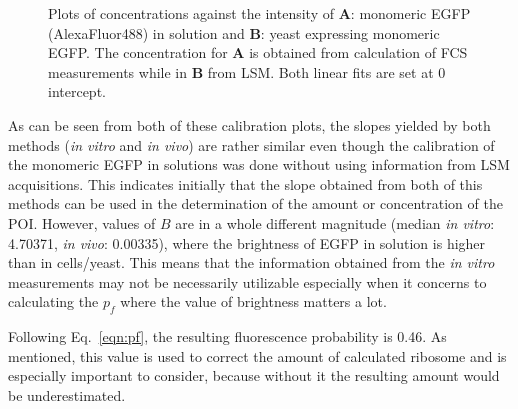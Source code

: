 \begin{figure}[!h]
\centering
{}\hfil
{}
\caption{Plots of concentrations against the intensity of \textbf{A}: monomeric EGFP (AlexaFluor488) in solution and \textbf{B}: yeast expressing monomeric EGFP. The concentration for \textbf{A} is obtained from calculation of FCS measurements while in \textbf{B} from LSM. 
Both linear fits are set at 0 intercept.}
\label{fig:monogfp}
\end{figure}

As can be seen from both of these calibration plots, the slopes yielded by both methods (\textit{in vitro} and \textit{in vivo}) are rather similar even though the calibration of the monomeric EGFP in solutions was done without using information from LSM acquisitions. 
This indicates initially that the slope obtained from both of this methods can be used in the determination of the amount or concentration of the POI. However, values of $B$ are in a whole different magnitude (median \textit{in vitro}: 4.70371, \textit{in vivo}: 0.00335), where the brightness of EGFP in solution is higher than in cells/yeast. 
This means that the information obtained from the \textit{in vitro} measurements may not be necessarily utilizable especially when it concerns to calculating the $p_{f}$ where the value of brightness matters a lot.

Following Eq.~\ref{eqn:pf}, the resulting fluorescence probability is 0.46. As mentioned, this value is used to correct the amount of calculated ribosome and is especially important to consider, because without it the resulting amount would be underestimated.

